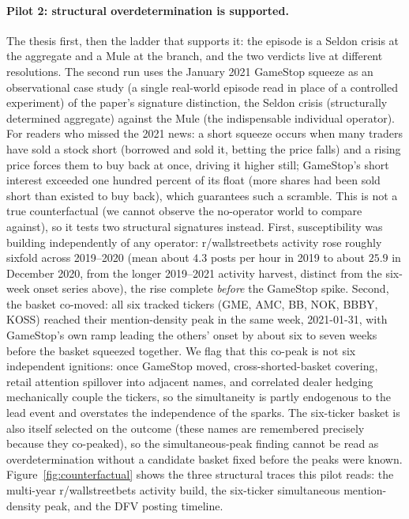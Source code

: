 \documentclass[11pt]{article}
\begin{document}
\paragraph{Pilot 2: structural overdetermination is supported.} The thesis first, then the ladder that supports it: the episode is a Seldon crisis at the aggregate and a Mule at the branch, and the two verdicts live at different resolutions. The second run uses the January 2021 GameStop squeeze as an observational case study (a single real-world episode read in place of a controlled experiment) of the paper's signature distinction, the Seldon crisis (structurally determined aggregate) against the Mule (the indispensable individual operator). For readers who missed the 2021 news: a short squeeze occurs when many traders have sold a stock short (borrowed and sold it, betting the price falls) and a rising price forces them to buy back at once, driving it higher still; GameStop's short interest exceeded one hundred percent of its float (more shares had been sold short than existed to buy back), which guarantees such a scramble. This is not a true counterfactual (we cannot observe the no-operator world to compare against), so it tests two structural signatures instead. First, susceptibility was building independently of any operator: r/wallstreetbets activity rose roughly sixfold across 2019--2020 (mean about $4.3$ posts per hour in 2019 to about $25.9$ in December 2020, from the longer 2019--2021 activity harvest, distinct from the six-week onset series above), the rise complete \emph{before} the GameStop spike. Second, the basket co-moved: all six tracked tickers (GME, AMC, BB, NOK, BBBY, KOSS) reached their mention-density peak in the same week, 2021-01-31, with GameStop's own ramp leading the others' onset by about six to seven weeks before the basket squeezed together. We flag that this co-peak is not six independent ignitions: once GameStop moved, cross-shorted-basket covering, retail attention spillover into adjacent names, and correlated dealer hedging mechanically couple the tickers, so the simultaneity is partly endogenous to the lead event and overstates the independence of the sparks. The six-ticker basket is also itself selected on the outcome (these names are remembered precisely because they co-peaked), so the simultaneous-peak finding cannot be read as overdetermination without a candidate basket fixed before the peaks were known. Figure~\ref{fig:counterfactual} shows the three structural traces this pilot reads: the multi-year r/wallstreetbets activity build, the six-ticker simultaneous mention-density peak, and the DFV posting timeline.
\end{document}
